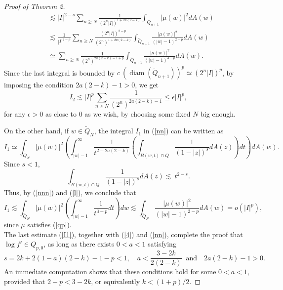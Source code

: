 \documentclass[12pt,a4paper]{article}
\theoremstyle{definition}
\theoremstyle{remark}
\newcommand{\diam}{\operatorname{diam}}
\numberwithin{komcounter}{section}
\begin{document}
\begin{proof}[Proof of Theorem 2]
\begin{align}
&\lesssim |I|^{2-s}\sum_{n\geq N}\frac{1}{(2^n|I|)^{1+2a(2-k)}} \int_{\tilde{Q}_{n+1}}|\mu(w)|^2 dA(w) \nonumber\\&\lesssim \frac{1}{|I|^{2-p}}
\sum_{n\geq N}\frac{(2^n |I|)^{2-p}}{(2^n)^{1+2a(2-k)}} \int_{\tilde{Q}_{n+1}}\frac{|\mu(w)|^2}{(|w|-1)^{2-p}} dA(w)\nonumber\\
&\simeq \sum_{n\geq N} \frac{1}{(2^n)^{2a(2-k)-1+p}}\int_{\tilde{Q}_{n+1}}\frac{|\mu(w)|^2}{(|w|-1)^{2-p}} dA(w).\nonumber
\end{align}
Since the last integral is bounded by $ c~(\diam (\tilde{Q}_{n+1}))^p\simeq (2^n |I|)^p$, by imposing the condition  $2a(2-k)-1>0$, we get 
\begin{equation}\label{4}
I_2\lesssim  |I|^p \sum_{n\geq N}\frac{1}{(2^n)^{2a(2-k)-1}}\leq \epsilon |I|^p,
\end{equation}
for any $\epsilon>0$ as close to $0$ as we wish, by choosing some fixed $N$ big enough.

On the other hand, if $w\in \tilde{Q}_N$, the integral $I_1$ in (\ref{nn}) can be written as 
\begin{equation}\label{nnn}
I_1\simeq\int_{\tilde{Q}_N} |\mu(w)|^2\left(\int_{|w|-1}^\infty  \frac{1}{t^{2+2a(2-k)}} \left(\int_{B(w,t)\cap Q}\frac{1}{(1-|z|)^{s}}   dA(z)\right)dt \right)dA(w).
\end{equation}
Since $s<1$,
\begin{equation}\label{l}
\int_{B(w,t) \cap Q}\frac{1}{(1-|z|)^{s}} dA(z) \lesssim ~ t^{2-s}.
\end{equation}
Thus,  by (\ref{nnn}) and (\ref{l}), we conclude that
\begin{equation}\label{I1}
I_1\lesssim \int_{\tilde{Q}_N}|\mu(w)|^2\left(	
\int_{|w|-1}^\infty \frac{1}{t^{3-p}} dt\right)dw \lesssim \int_{\tilde{Q}_N} \frac{|\mu(w)|^2}{(|w|-1)^{2-p}} dA(w)=o(|I|^p),
\end{equation}
since $\mu$ satisfies (\ref{qp}).\\
\indent
The last estimate (\ref{I1}), together with (\ref{4})  and (\ref{nn}), complete the proof that $\log f'\in Q_{p,0}$, as long as there exists $0<a<1$ satisfying $$s= 2k+2(1-a)(2-k)-1-p<1, \quad	a<\frac{3-2k}{2(2-k)}~\textrm{ and}\quad 2a(2-k)-1>0.$$
An immediate computation shows that these conditions hold for some $0<a<1$, provided that $2-p<3-2k$, or equivalently $k<(1+p)/2$.


\end{proof}
\end{document}
